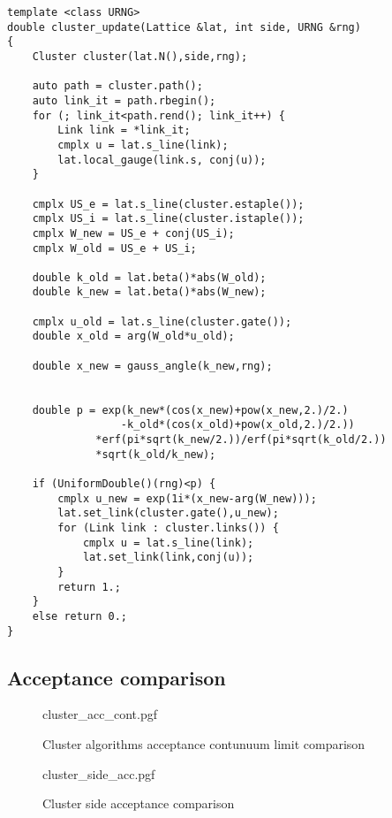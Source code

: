\begin{lstlisting}[caption={Metropolis-Hastings cluster update}]
template <class URNG>
double cluster_update(Lattice &lat, int side, URNG &rng)
{
    Cluster cluster(lat.N(),side,rng);

    auto path = cluster.path();
    auto link_it = path.rbegin();
    for (; link_it<path.rend(); link_it++) {
        Link link = *link_it;
        cmplx u = lat.s_line(link);
        lat.local_gauge(link.s, conj(u));
    }
    
    cmplx US_e = lat.s_line(cluster.estaple());
    cmplx US_i = lat.s_line(cluster.istaple());
    cmplx W_new = US_e + conj(US_i);
    cmplx W_old = US_e + US_i;
    
    double k_old = lat.beta()*abs(W_old);
    double k_new = lat.beta()*abs(W_new);

    cmplx u_old = lat.s_line(cluster.gate());
    double x_old = arg(W_old*u_old);
    
    double x_new = gauss_angle(k_new,rng);
    

    double p = exp(k_new*(cos(x_new)+pow(x_new,2.)/2.)
                  -k_old*(cos(x_old)+pow(x_old,2.)/2.))
              *erf(pi*sqrt(k_new/2.))/erf(pi*sqrt(k_old/2.))
              *sqrt(k_old/k_new);
    
    if (UniformDouble()(rng)<p) {
        cmplx u_new = exp(1i*(x_new-arg(W_new)));
        lat.set_link(cluster.gate(),u_new);
        for (Link link : cluster.links()) {
            cmplx u = lat.s_line(link);
            lat.set_link(link,conj(u));
        }
        return 1.;
    }
    else return 0.;
}
\end{lstlisting}

\subsection*{Acceptance comparison}

\begin{figure}[!htb]
    \centering
    {cluster_acc_cont.pgf}
    \caption{Cluster algorithms acceptance contunuum limit comparison}
    \label{fig:cluster_acc_cont}
\end{figure}

\begin{figure}[!htb]
	\centering
    {cluster_side_acc.pgf}
    \caption{Cluster side acceptance comparison}
    \label{fig:cluster_side_acc}
\end{figure}

